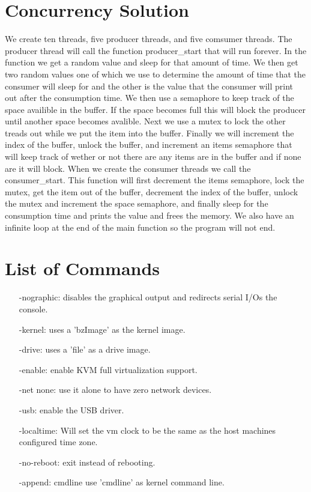 \documentclass[letterpaper,10pt,titlepage]{article}
\begin{document}
\section{Concurrency Solution}
We create ten threads, five producer threads, and five comsumer threads. The
producer thread will call the function producer\_start that will run forever.
In the function we get a random value and sleep for that amount of time. We then
get two random values one of which we use to determine the amount of time that
the consumer will sleep for and the other is the value that the consumer will
print out after the consumption time. We then use a semaphore to keep track 
of the space availible in the buffer. If the space becomes full this will 
block the producer until another space becomes avalible. Next we use a mutex
to lock the other treads out while we put the item into the buffer. Finally we
will increment the index of the buffer, unlock the buffer, and increment an 
items semaphore that will keep track of wether or not there are any items are 
in the buffer and if none are it will block. When we create the consumer 
threads we call the consumer\_start. This function will first decrement the 
items semaphore, lock the mutex, get the item out of the buffer, decrement the 
index of the buffer, unlock the mutex and increment the space semaphore, and 
finally sleep for the consumption time and prints the value and frees the 
memory. We also have an infinite loop at the end of the main function so the 
program will not end.

\section{List of Commands}
\begin{enumerate}
   \item[-nographic:] disables the graphical output and redirects serial I/Os the console.
   \item[-kernel:] uses a 'bzImage' as the kernel image.
   \item[-drive:] uses a 'file' as a drive image.
   \item[-enable:] enable KVM full virtualization support.
   \item[-net none:] use it alone to have zero network devices.
   \item[-usb:] enable the USB driver.
   \item[-localtime:] Will set the vm clock to be the same as the host machines configured 
      time zone.
   \item[-no-reboot:] exit instead of rebooting.
   \item[-append:] cmdline use 'cmdline' as kernel command line.
\end{enumerate}
\end{document}
